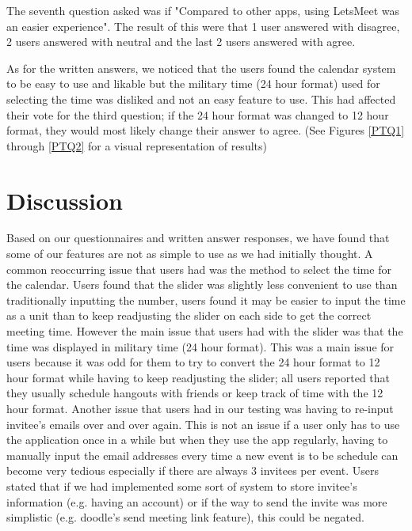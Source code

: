 \documentclass{sigchi}
\begin{document}
The seventh question asked was if "Compared to other apps, using LetsMeet was an easier experience". The result of this were that 1 user answered with disagree, 2 users answered with neutral and the last 2 users answered with agree.

As for the written answers, we noticed that the users found the calendar system to be easy to use and likable but the military time (24 hour format) used for selecting the time was disliked and not an easy feature to use. This had affected their vote for the third question; if the 24 hour format was changed to 12 hour format, they would most likely change their answer to agree. (See Figures \ref{PTQ1} through \ref{PTQ2} for a visual representation of results)

\section{Discussion}

Based on our questionnaires and written answer responses, we have found that some of our features are not as simple to use as we had initially thought. A common reoccurring issue that users had was the method to select the time for the calendar. Users found that the slider was slightly less convenient to use than traditionally inputting the number, users found it may be easier to input the time as a unit than to keep readjusting the slider on each side to get the correct meeting time. However the main issue that users had with the slider was that the time was displayed in military time (24 hour format). This was a main issue for users because it was odd for them to try to convert the 24 hour format to 12 hour format while having to keep readjusting the slider; all users reported that they usually schedule hangouts with friends or keep track of time with the 12 hour format. Another issue that users had in our testing was having to re-input invitee's emails over and over again. This is not an issue if a user only has to use the application once in a while but when they use the app regularly, having to manually input the email addresses every time a new event is to be schedule can become very tedious especially if there are always 3 invitees per event. Users stated that if we had implemented some sort of system to store invitee's information (e.g. having an account) or if the way to send the invite was more simplistic (e.g. doodle's send meeting link feature), this could be negated.
\end{document}
